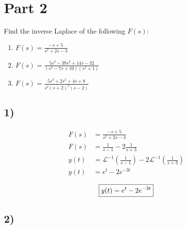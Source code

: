 \documentclass{article}
\begin{document}
\newcommand{\hr}{\par\noindent\rule{\textwidth}{0.4pt}}

\newcommand{\bc}[1]{
	\begin{equation*}
		\begin{boxed}
			{#1}
		\end{boxed}
	\end{equation*}
}

\newcommand{\cond}[2]{
	\ifmmode
		{#1} \quad {#2}
	\else
		$$ {#1} \quad {#2} $$
	\fi
}

\newcommand{\matr}[1]{
	\ifmmode \bm{#1}
	\else \textit{\textbf{#1}}
	\fi
}
\newcommand{\vect}[1]{
	\ifmmode \mathbf{#1}
	\else \textbf{#1}
	\fi
}

\newcommand{\lap}{\mathcal{L}}
\newcommand{\ilap}{\mathcal{L}^{-1}}

\section{Part 2}

Find the inverse Laplace of the following $ F(s) $:

\begin{enumerate}[label = \textbf{\arabic*)}]
	\item $ F(s) = \frac{-s + 5}{s^2 + 2s - 3} $
	\item $ F(s) = \frac{5s^3 - 39s^2 + 14s - 32}{(s^2 - 7s + 10)(s^2 + 1)} $
	\item $ F(s) = \frac{5s^3 + 2s^2 + 4s + 8}{s^2(s + 2)^2(s - 2)} $
\end{enumerate}

\subsection{1)}

\begin{align*}
	F(s) & = \frac{-s + 5}{s^2 + 2s - 3} \\
	F(s) & = \frac{1}{s - 1} - 2\frac{1}{s + 3} \\
	y(t) & = \ilap \left( \frac{1}{s - 1} \right) - 2\ilap \left( \frac{1}{s + 3} \right) \\
	y(t) & = e^t - 2e^{-3t}
\end{align*}
\bc{ y(t) = e^t - 2e^{-3t} }

\subsection{2)}
\end{document}
